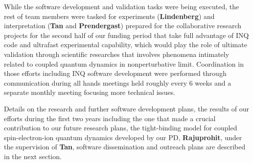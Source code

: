 While the software development and validation tasks were being executed, the rest of team members were tasked for experiments ({\bf Lindenberg}) and interpretation ({\bf Tan} and {\bf Prendergast}) prepared for the collaborative research projects for the second half of our funding period that take full advantage of INQ code and ultrafast experimental capability, which would play the role of ultimate validation through scientific researches that involves phenomena intimately related to coupled quantum dynamics in nonperturbative limit. 
Coordination in those efforts including INQ software development were performed through communication during all hands meetings held roughly every 6 weeks and a separate monthly meeting focusing more technical issues.

Details on the research and further software development plans, the results of our efforts during the first two years including the one that made a crucial contribution to our future research plans, the tight-binding model for coupled spin-electron-ion quantum dynamics developed by our PD, {\bf Rajuprohit}, under the supervision of {\bf Tan}, software dissemination and outreach plans are described in the next section.
 
\clearpage
